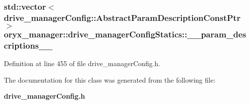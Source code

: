 \subsubsection[{\-\_\-\-\_\-param\-\_\-descriptions\-\_\-\-\_\-}]{\setlength{\rightskip}{0pt plus 5cm}std\-::vector$<${\bf drive\-\_\-manager\-Config\-::\-Abstract\-Param\-Description\-Const\-Ptr}$>$ {\bf oryx\-\_\-manager\-::drive\-\_\-manager\-Config\-Statics\-::\-\_\-\-\_\-param\-\_\-descriptions\-\_\-\-\_\-}\hspace{0.3cm}{\ttfamily  [private]}}\label{classoryx__manager_1_1drive__managerConfigStatics_a2f04c5ec68909358f8174b1316a148e4}


\-Definition at line 455 of file drive\-\_\-manager\-Config.\-h.



\-The documentation for this class was generated from the following file\-:\begin{DoxyCompactItemize}
\item 
{\bf drive\-\_\-manager\-Config.\-h}\end{DoxyCompactItemize}
